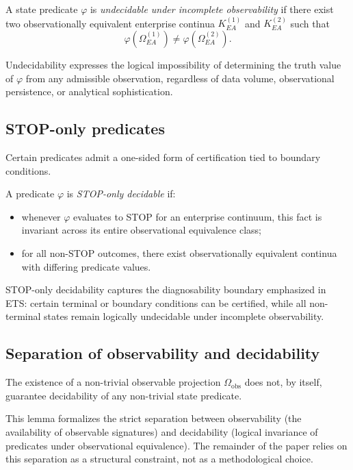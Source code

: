 \begin{definition}[Undecidability]
A state predicate $\varphi$ is \emph{undecidable under incomplete
observability} if there exist two observationally equivalent enterprise
continua $K_{EA}^{(1)}$ and $K_{EA}^{(2)}$ such that
\[
\varphi\!\left(\Omega_{EA}^{(1)}\right)
\neq
\varphi\!\left(\Omega_{EA}^{(2)}\right).
\]
\end{definition}

Undecidability expresses the logical impossibility of determining the
truth value of $\varphi$ from any admissible observation, regardless of
data volume, observational persistence, or analytical sophistication.

\subsection{STOP-only predicates}
\label{subsec:stop-only}

Certain predicates admit a one-sided form of certification tied to
boundary conditions.

\begin{definition}
A predicate $\varphi$ is \emph{STOP-only decidable} if:
\begin{itemize}
\item whenever $\varphi$ evaluates to STOP for an enterprise continuum,
      this fact is invariant across its entire observational
      equivalence class;
\item for all non-STOP outcomes, there exist observationally equivalent
      continua with differing predicate values.
\end{itemize}
\end{definition}

STOP-only decidability captures the diagnosability boundary emphasized
in ETS: certain terminal or boundary conditions can be certified, while
all non-terminal states remain logically undecidable under incomplete
observability.

\subsection{Separation of observability and decidability}
\label{subsec:obs-vs-decidability}

\begin{lemma}
The existence of a non-trivial observable projection
$\Omega_{\mathrm{obs}}$ does not, by itself, guarantee decidability of
any non-trivial state predicate.
\end{lemma}

\noindent
This lemma formalizes the strict separation between observability
(the availability of observable signatures) and decidability (logical
invariance of predicates under observational equivalence). The remainder
of the paper relies on this separation as a structural constraint, not
as a methodological choice.
